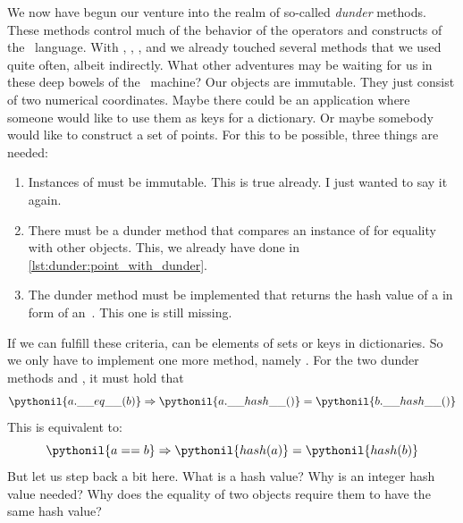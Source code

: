 We now have begun our venture into the realm of so-called \emph{dunder} methods.
These methods control much of the behavior of the operators and constructs of the \python\ language.
With , , , and  we already touched several methods that we used quite often, albeit indirectly.
What other adventures may be waiting for us in these deep bowels of the \python\ machine?%
\FloatBarrier%
\endhsection%
%
%
%
\label{sec:hashDunder}%
%
%
%
%
%
%
%
Our  objects are immutable.
They just consist of two numerical coordinates.
Maybe there could be an application where someone would like to use them as keys for a dictionary.
Or maybe somebody would like to construct a set of points.
For this to be possible, three things are needed:%
%
\begin{enumerate}%
%
\item Instances of  must be immutable. %
This is true already. %
I just wanted to say it again.%
%
\item There must be a dunder method  that compares an instance of  for equality with other objects. %
This, we already have done in \cref{lst:dunder:point_with_dunder}.%
%
\item The dunder method  must be implemented that returns the hash value of a  in form of an~. %
This one is still missing.%
%
\end{enumerate}%
%
If we can fulfill these criteria,  can be elements of sets or keys in dictionaries.
So we only have to implement one more method, namely .
For the two dunder methods  and \dunder{hash]}, it must hold that%
%
\begin{equation}%
\pythonil{a.\_\_eq\_\_(b)} \Rightarrow \pythonil{a.\_\_hash\_\_()} = \pythonil{b.\_\_hash\_\_()}%
\label{eq:eqAndHash1}%
\end{equation}%
%
This is equivalent to:%
%
\begin{equation}%
\pythonil{a == b} \Rightarrow \pythonil{hash(a)} = \pythonil{hash(b)}%
\label{eq:eqAndHash2}%
\end{equation}%
%
But let us step back a bit here.
What is a hash value?
Why is an integer hash value needed?
Why does the equality of two objects require them to have the same hash value?

